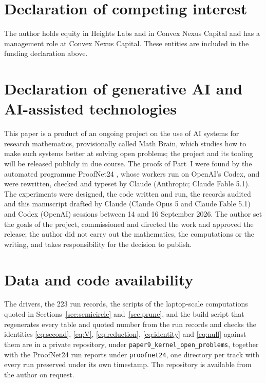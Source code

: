 \documentclass[11pt]{article}
\theoremstyle{definition}
\newcommand{\numRecords}{223}
\begin{document}
\section*{Declaration of competing interest}
The author holds equity in Heights Labs and in Convex Nexus Capital and has a management role at
Convex Nexus Capital. These entities are included in the funding declaration above.

\section*{Declaration of generative AI and AI-assisted technologies}
This paper is a product of an ongoing project on the use of AI systems for research mathematics,
provisionally called Math Brain, which studies how to make such systems better at solving open
problems; the project and its tooling will be released publicly in due course. The proofs of
Part~I were found by the automated programme ProofNet24 \cite{PN24}, whose workers run on OpenAI's
Codex, and were rewritten, checked and typeset by Claude (Anthropic; Claude Fable 5.1). The
experiments were designed, the code written and run, the records audited and this manuscript
drafted by Claude (Claude Opus 5 and Claude Fable 5.1) and Codex (OpenAI) sessions between 14 and 16
September 2026. The author set the goals of the project, commissioned and directed the work and
approved the release; the author did not carry out the mathematics, the computations or the writing,
and takes responsibility for the decision to publish.

\section*{Data and code availability}
The drivers, the \numRecords{} run records, the scripts of the laptop-scale computations quoted in
Sections~\ref{sec:semicircle} and~\ref{sec:prune}, and the build script that regenerates every table
and quoted number from the run records and checks the identities \eqref{eq:second}, \eqref{eq:V},
\eqref{eq:reduction}, \eqref{eq:identity} and \eqref{eq:null} against them are in a private
repository, under \texttt{paper9\_kernel\_open\_problems}, together
with the ProofNet24 run reports under \texttt{proofnet24}, one directory per track with every run
preserved under its own timestamp. The repository is available from the author on request.
\end{document}
